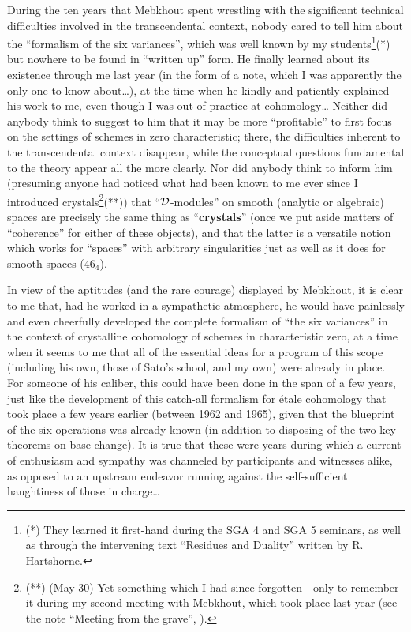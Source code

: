 During the ten years that Mebkhout spent wrestling
with the significant technical difficulties involved in the transcendental context, nobody cared to tell him
about the ``formalism of the six variances'', which was well known by my students\footnote{(*) They
learned it first-hand during the SGA 4 and SGA 5 seminars, as well as through the
intervening text ``Residues and Duality'' written by R. Hartshorne.}(*) but nowhere to be
found in ``written up'' form.
He finally learned about its existence through me last year 
(in the form of a note, which I was apparently the only one to know about\ldots),
at the time when he kindly and patiently explained his work to me, even though I was
out of practice at cohomology\ldots
Neither did anybody think to suggest to him that it may be more ``profitable'' to first focus on the settings of schemes in zero characteristic; there, the difficulties
inherent to the transcendental context disappear, while the conceptual
questions fundamental to the theory appear all the more clearly. 
Nor did anybody think to inform him 
(presuming anyone had noticed
what had been known to me ever since I introduced crystals\footnote{(**) (May 30) Yet something
which I had since forgotten - only to remember it during my second meeting with Mebkhout, which took place last year (see the note ``Meeting from the grave'', ).}(**))
that ``$\mathcal{D}$-modules'' on smooth (analytic or algebraic) spaces are precisely the same
thing as ``\textbf{crystals}'' (once we put aside matters of ``coherence'' for
either of these objects), and that the latter is a versatile notion which works for ``spaces'' with arbitrary singularities just as well as it does for smooth spaces ($46_4$).

In view of the aptitudes (and the rare courage) displayed by Mebkhout, it is clear to me
that, had he worked in a sympathetic atmosphere, he would have painlessly and even 
cheerfully developed the complete formalism of ``the six variances'' in the context
of crystalline cohomology of schemes in characteristic zero, at a time when it seems to me that all of the
essential ideas for a program of this scope
(including his own, those of Sato's school, and my own)
were already in place.
For someone of his caliber, this could have been done in the span of a few years, 
just like the development of this catch-all formalism 
for \'etale cohomology that took place a few years
earlier (between 1962 and 1965), given that the blueprint of the six-operations was already
known (in addition to disposing of the two key theorems on base change).
It is true that these were years during which a current of enthusiasm and sympathy was channeled by participants and witnesses alike, as opposed to an upstream endeavor running against the self-sufficient haughtiness of those in charge\ldots

